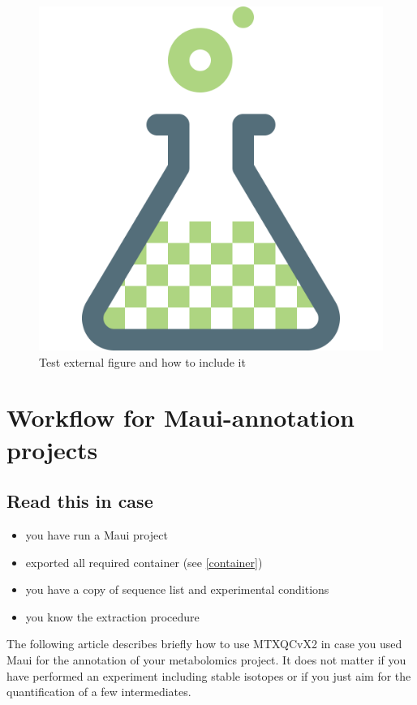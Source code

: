 \documentclass[]{book}
\providecommand{\tightlist}{%
  \setlength{\itemsep}{0pt}\setlength{\parskip}{0pt}}
\theoremstyle{definition}
\theoremstyle{definition}
\theoremstyle{definition}
\theoremstyle{remark}
\begin{document}
\begin{figure}
\centering
\includegraphics{images/now.png}
\caption{\label{fig:flow}Test external figure and how to include it}
\end{figure}

\hypertarget{wf:maui}{\chapter{Workflow for Maui-annotation
projects}\label{wf:maui}}

\section{Read this in case}\label{read-this-in-case}

\begin{itemize}
\tightlist
\item
  you have run a Maui project
\item
  exported all required container (see \ref{container})
\item
  you have a copy of sequence list and experimental conditions
\item
  you know the extraction procedure
\end{itemize}

The following article describes briefly how to use MTXQCvX2 in case you
used Maui for the annotation of your metabolomics project. It does not
matter if you have performed an experiment including stable isotopes or
if you just aim for the quantification of a few intermediates.
\end{document}
